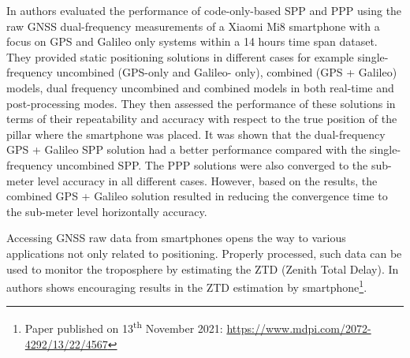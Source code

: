 In \cite{Psychas2019} authors evaluated the performance of code-only-based SPP and PPP using the raw GNSS dual-frequency measurements of a Xiaomi Mi8 smartphone with a focus on GPS and Galileo only systems within a 14 hours time span dataset. They provided static positioning solutions in different cases for example single-frequency uncombined (GPS-only and Galileo-
only), combined (GPS + Galileo) models, dual frequency uncombined and combined models in
both real-time and post-processing modes. They then assessed the performance of these solutions in terms of their repeatability and accuracy with respect to the true position of the pillar where the smartphone was placed. It was shown that the dual-frequency GPS + Galileo
SPP solution had a better performance compared with the single-frequency uncombined SPP. The PPP
solutions were also converged to the sub-meter level accuracy in all different cases. However, based on the results, the combined GPS + Galileo solution resulted in reducing the convergence time to the sub-meter level horizontally accuracy.

Accessing GNSS raw data from smartphones opens the way to various applications not only related to positioning. Properly processed, such data can be used to monitor the troposphere by estimating the ZTD (Zenith Total Delay). In \cite{benvenuto:2021} authors shows encouraging results in the ZTD estimation by smartphone\footnote{Paper published on 13\textsuperscript{th} November 2021: \url{https://www.mdpi.com/2072-4292/13/22/4567}}.

